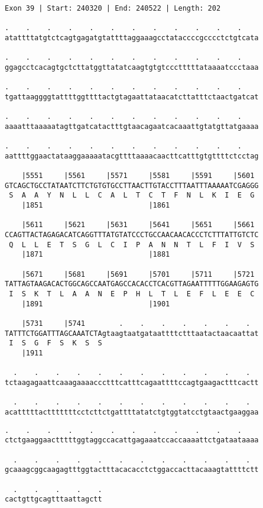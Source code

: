 \documentclass{article}
\begin{document}
\begin{Verbatim}[fontfamily=courier]
Exon 39 | Start: 240320 | End: 240522 | Length: 202

.    .    .    .    .    .    .    .    .    .    .    .    
atattttatgtctcagtgagatgtattttaggaaagcctataccccgcccctctgtcata

.    .    .    .    .    .    .    .    .    .    .    .    
ggagcctcacagtgctcttatggttatatcaagtgtgtccctttttataaaatccctaaa

.    .    .    .    .    .    .    .    .    .    .    .    
tgattaaggggtattttggttttactgtagaattataacatcttatttctaactgatcat

.    .    .    .    .    .    .    .    .    .    .    .    
aaaatttaaaaatagttgatcatactttgtaacagaatcacaaattgtatgttatgaaaa

.    .    .    .    .    .    .    .    .    .    .    .    
aattttggaactataaggaaaaatacgttttaaaacaacttcatttgtgttttctcctag

    |5551     |5561     |5571     |5581     |5591     |5601 
GTCAGCTGCCTATAATCTTCTGTGTGCCTTAACTTGTACCTTTAATTTAAAAATCGAGGG
 S  A  A  Y  N  L  L  C  A  L  T  C  T  F  N  L  K  I  E  G 
    |1851                         |1861                     

    |5611     |5621     |5631     |5641     |5651     |5661 
CCAGTTACTAGAGACATCAGGTTTATGTATCCCTGCCAACAACACCCTCTTTATTGTCTC
 Q  L  L  E  T  S  G  L  C  I  P  A  N  N  T  L  F  I  V  S 
    |1871                         |1881                     

    |5671     |5681     |5691     |5701     |5711     |5721 
TATTAGTAAGACACTGGCAGCCAATGAGCCACACCTCACGTTAGAATTTTTGGAAGAGTG
 I  S  K  T  L  A  A  N  E  P  H  L  T  L  E  F  L  E  E  C 
    |1891                         |1901                     

    |5731     |5741        .    .    .    .    .    .    .  
TATTTCTGGATTTAGCAAATCTAgtaagtaatgataattttctttaatactaacaattat
 I  S  G  F  S  K  S  S                                     
    |1911                                                   

  .    .    .    .    .    .    .    .    .    .    .    .  
tctaagagaattcaaagaaaaccctttcatttcagaattttccagtgaagactttcactt

  .    .    .    .    .    .    .    .    .    .    .    .  
acatttttactttttttcctcttctgattttatatctgtggtatcctgtaactgaaggaa

\end{Verbatim}
\newpage
\begin{Verbatim}[fontfamily=courier]
  .    .    .    .    .    .    .    .    .    .    .    .  
ctctgaaggaactttttggtaggccacattgagaaatccaccaaaattctgataataaaa

  .    .    .    .    .    .    .    .    .    .    .    .  
gcaaagcggcaagagtttggtactttacacacctctggaccacttacaaagtattttctt

  .    .    .    .    .
cactgttgcagtttaattagctt
\end{Verbatim}
\end{document}
